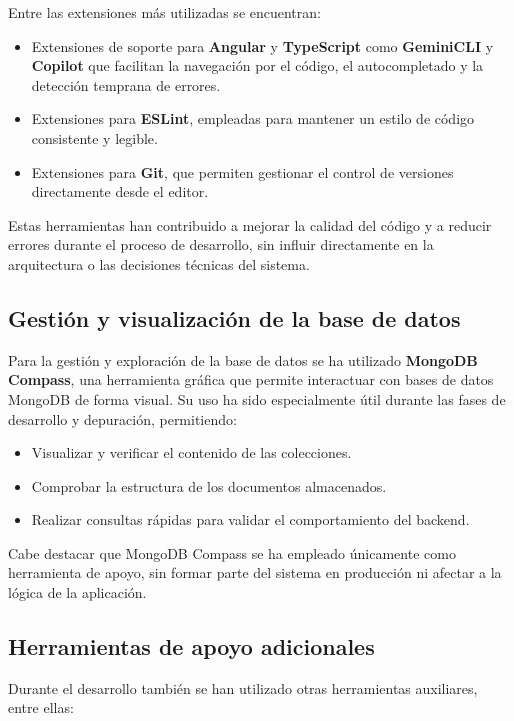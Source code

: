 Entre las extensiones más utilizadas se encuentran:
\begin{itemize}
    \item Extensiones de soporte para \textbf{Angular} y \textbf{TypeScript} como \textbf{GeminiCLI} y \textbf{Copilot} que facilitan la navegación por el código, el autocompletado y la detección temprana de errores.
    \item Extensiones para \textbf{ESLint}, empleadas para mantener un estilo de código consistente y legible.
    \item Extensiones para \textbf{Git}, que permiten gestionar el control de versiones directamente desde el editor.
\end{itemize}

Estas herramientas han contribuido a mejorar la calidad del código y a reducir errores durante el proceso de desarrollo, sin influir directamente en la arquitectura o las decisiones técnicas del sistema.

\subsection{Gestión y visualización de la base de datos}

Para la gestión y exploración de la base de datos se ha utilizado \textbf{MongoDB Compass}, una herramienta gráfica que permite interactuar con bases de datos MongoDB de forma visual. Su uso ha sido especialmente útil durante las fases de desarrollo y depuración, permitiendo:

\begin{itemize}
    \item Visualizar y verificar el contenido de las colecciones.
    \item Comprobar la estructura de los documentos almacenados.
    \item Realizar consultas rápidas para validar el comportamiento del backend.
\end{itemize}

Cabe destacar que MongoDB Compass se ha empleado únicamente como herramienta de apoyo, sin formar parte del sistema en producción ni afectar a la lógica de la aplicación.
\subsection{Herramientas de apoyo adicionales}

Durante el desarrollo también se han utilizado otras herramientas auxiliares, entre ellas:

